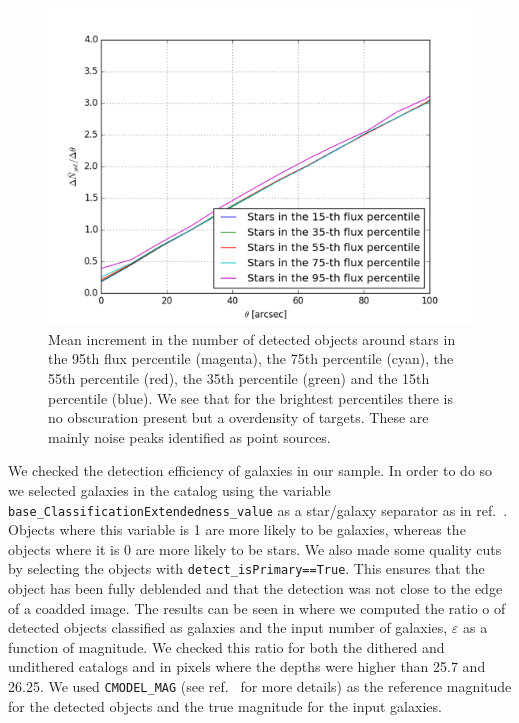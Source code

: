 \documentclass[\docopts]{\docclass}
\begin{document}
\begin{figure}
\centering
\includegraphics[width=0.9\columnwidth]{dngal_dtheta.png}
\caption{Mean increment in the number of detected objects around stars in the 95th flux percentile (magenta), the 75th percentile (cyan), the 55th percentile (red), the 35th percentile (green) and the 15th percentile (blue). We see that for the brightest percentiles there is no obscuration present but a overdensity of targets. These are mainly noise peaks identified as point sources.}
\label{fig:galdens_derivative}
\end{figure}

We checked the detection efficiency of galaxies in our sample. In order to do so we selected galaxies in the catalog using the variable \texttt{base\_ClassificationExtendedness\_value} as a star/galaxy separator as in ref.~\citep{2017arXiv170506766B}. Objects where this variable is 1 are more likely to be galaxies, whereas the objects where it is 0 are more likely to be stars. We also made some quality cuts by selecting the objects with \texttt{detect\_isPrimary==True}. This ensures that the object has been fully deblended and that the detection was not close to the edge of a coadded image. The results can be seen in  where we computed the ratio o of detected objects classified as galaxies and the input number of galaxies, $\varepsilon$ as a function of magnitude. We checked this ratio for both the dithered and undithered catalogs and in pixels where the depths were higher than 25.7 and 26.25. We used \texttt{CMODEL\_MAG} (see ref.~\citep{2017arXiv170506766B} for more details) as the reference magnitude for the detected objects and the true magnitude for the input galaxies.
\end{document}
